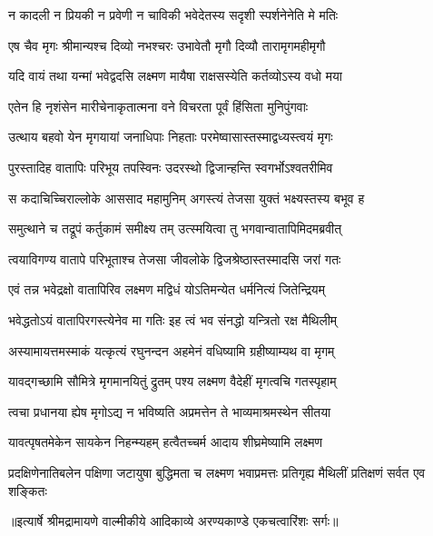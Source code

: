 \twolineshloka
{न कादली न प्रियकी न प्रवेणी न चाविकी}
{भवेदेतस्य सदृशी स्पर्शनेनेति मे मतिः} %

\twolineshloka
{एष चैव मृगः श्रीमान्यश्च दिव्यो नभश्चरः}
{उभावेतौ मृगौ दिव्यौ तारामृगमहीमृगौ} %

\twolineshloka
{यदि वायं तथा यन्मां भवेद्वदसि लक्ष्मण}
{मायैषा राक्षसस्येति कर्तव्योऽस्य वधो मया} %

\twolineshloka
{एतेन हि नृशंसेन मारीचेनाकृतात्मना}
{वने विचरता पूर्वं हिंसिता मुनिपुंगवाः} %

\twolineshloka
{उत्थाय बहवो येन मृगयायां जनाधिपाः}
{निहताः परमेष्वासास्तस्माद्वध्यस्त्वयं मृगः} %

\twolineshloka
{पुरस्तादिह वातापिः परिभूय तपस्विनः}
{उदरस्थो द्विजान्हन्ति स्वगर्भोऽश्वतरीमिव} %

\twolineshloka
{स कदाचिच्चिराल्लोके आससाद महामुनिम्}
{अगस्त्यं तेजसा युक्तं भक्ष्यस्तस्य बभूव ह} %

\twolineshloka
{समुत्थाने च तद्रूपं कर्तुकामं समीक्ष्य तम्}
{उत्स्मयित्वा तु भगवान्वातापिमिदमब्रवीत्} %

\twolineshloka
{त्वयाविगण्य वातापे परिभूताश्च तेजसा}
{जीवलोके द्विजश्रेष्ठास्तस्मादसि जरां गतः} %

\twolineshloka
{एवं तन्न भवेद्रक्षो वातापिरिव लक्ष्मण}
{मद्विधं योऽतिमन्येत धर्मनित्यं जितेन्द्रियम्} %

\twolineshloka
{भवेद्धतोऽयं वातापिरगस्त्येनेव मा गतिः}
{इह त्वं भव संनद्धो यन्त्रितो रक्ष मैथिलीम्} %

\twolineshloka
{अस्यामायत्तमस्माकं यत्कृत्यं रघुनन्दन}
{अहमेनं वधिष्यामि ग्रहीष्याम्यथ वा मृगम्} %

\twolineshloka
{यावद्गच्छामि सौमित्रे मृगमानयितुं द्रुतम्}
{पश्य लक्ष्मण वैदेहीं मृगत्वचि गतस्पृहाम्} %

\twolineshloka
{त्वचा प्रधानया ह्येष मृगोऽद्य न भविष्यति}
{अप्रमत्तेन ते भाव्यमाश्रमस्थेन सीतया} %

\twolineshloka
{यावत्पृषतमेकेन सायकेन निहन्म्यहम्}
{हत्वैतच्चर्म आदाय शीघ्रमेष्यामि लक्ष्मण} %

\fourlineindentedshloka
{प्रदक्षिणेनातिबलेन पक्षिणा}
{ जटायुषा बुद्धिमता च लक्ष्मण}
{भवाप्रमत्तः प्रतिगृह्य मैथिलीं}
{ प्रतिक्षणं सर्वत एव शङ्कितः} %


{॥इत्यार्षे श्रीमद्रामायणे वाल्मीकीये आदिकाव्ये अरण्यकाण्डे एकचत्वारिंशः सर्गः॥}


